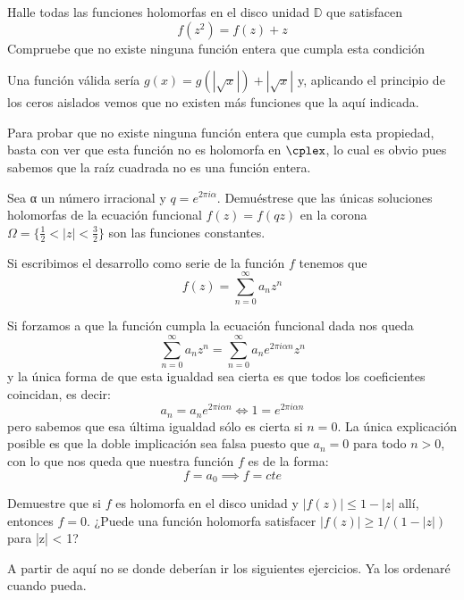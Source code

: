 \begin{problem}[5]
Halle todas las funciones holomorfas en el disco unidad $\mathbb{D}$ que satisfacen
\[f(z^2)=f(z)+z\]
Compruebe que no existe ninguna función entera que cumpla esta condición

\solution


Una función válida sería $g(x)=g(|\sqrt{x}|)+|\sqrt{x}|$ y, aplicando el principio de los ceros aislados vemos que no existen más funciones que la aquí indicada.

Para probar que no existe ninguna función entera que cumpla esta propiedad, basta con ver que esta función no es holomorfa en $\cplex$, lo cual es obvio pues sabemos que la raíz cuadrada no es una función entera.

\end{problem}

\begin{problem}[6]
Sea α un número irracional y $q=e^{2πiα}$. Demuéstrese que las únicas soluciones holomorfas de la ecuación funcional $f(z)=f(qz)$ en la corona $Ω = \{\frac{1}{2}<|z|<\frac{3}{2}\}$ son las funciones constantes.

\solution


Si escribimos el desarrollo como serie de la función $f$ tenemos que
\[f(z)=\sum_{n=0}^{\infty}a_n z^n\]

Si forzamos a que la función cumpla la ecuación funcional dada nos queda
\[\sum_{n=0}^{\infty}a_n z^n = \sum_{n=0}^{\infty}a_n e^{2πiαn}z^n\]
y la única forma de que esta igualdad sea cierta es que todos los coeficientes coincidan, es decir:
\[a_n=a_ne^{2πiαn} \iff 1 = e^{2πiαn}\]
pero sabemos que esa última igualdad sólo es cierta si $n=0$. La única explicación posible es que la doble implicación sea falsa puesto que $a_n=0$ para todo $n>0$, con lo que nos queda que nuestra función $f$ es de la forma:
\[f = a_0 \implies f=cte\]
\end{problem}

\begin{problem}[7]
Demuestre que si $f$ es holomorfa en el disco unidad y $|f(z)|\leq 1-|z|$ allí, entonces $f=0$. ¿Puede una función holomorfa satisfacer $|f(z)| \geq 1/(1-|z|)$ para |z| < 1?
\solution
\end{problem}

A partir de aquí no se donde deberían ir los siguientes ejercicios. Ya los ordenaré cuando pueda.

